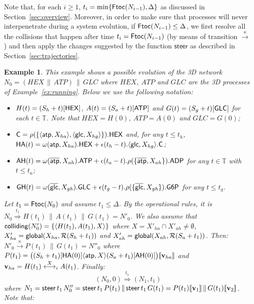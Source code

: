 \documentclass[11pt]{article}
\newtheorem{example}{Example}
\newcommand{\lsbrace}{\ensuremath{|\![}}
\newcommand{\rsbrace}{\ensuremath{]\!|}}
\newcommand{\reference}{{\sf global}}
\newcommand{\colliding}{{\sf colliding}}
\newcommand{\ftoc}{{\sf Ftoc}}
\newcommand{\mts}{\Delta}
\newcommand{\move}{\ensuremath{\mathsf{steer}}}
\newcommand{\nar}[1]{\xrightarrow{#1}}
\newcommand{\dnar}[1]{\stackrel{#1}{\Rightarrow}}
\newcommand{\collision}[2]{\stackrel{{#1}}{\longleftrightarrow}_{#2}}
\newcommand{\referencepoint}[1]{\ensuremath{{\cal R}(#1)}}
\newcommand{\timedomain}{{\mathbb T}}
\begin{document}
Note that, for each $i \geq 1$, $t_i = \min \{\ftoc(N_{i-1}), \mts\}$ as discussed in Section~\ref{sec:overview}. Moreover, in order to make sure that processes will never interpenetrate during a system evolution, if $\ftoc(N_{i-1}) \leq \mts$, we first resolve all the collisions that happen after time $t_i = \ftoc(N_{i-1})$ (by means of transition $\nar{\kappa}$) and then apply the changes suggested by the function $\move$ as described in Section~\ref{sec:trajectories}.

\begin{example}\label{ex:evolution}
This example shows a possible evolution of the 3D network $ N_0 = (HEX \,\|\, ATP) \,\|\, GLC$ where $HEX$, $ATP$ and $GLC$ are the 3D processes of Example~\ref{ex:running}. Below we use the following notation:

\begin{itemize}
\item [ - ]  $H(t)= (S_h + t) [{\sf HEX}]$, $A(t) = (S_a + t) [{\sf ATP}]$ and $G(t) = (S_g + t)
[{\sf GLC}]$ for each $t \in \timedomain$. Note that $HEX=H(0)$, $ATP=A(0)$ and $GLC=G(0)$;

\item [ - ]  ${\sf C}=  \rho(\{\langle {\sf atp}, X_{ha} \rangle, \langle  {\sf glc}, X_{hg}
\rangle\}). {\sf HEX}$  and, for any $t \leq t_h$,  ${\sf HA}(t) = \omega({\sf atp}, X_{ha}). {\sf
HEX} + \epsilon(t_h -t). \langle  {\sf glc}, X_{hg}  \rangle.{\sf C}$;

\item [ - ] ${\sf AH}(t) = \omega(\overline{{\sf atp}}, X_{ah}). {\sf ATP} + \epsilon(t_a -t).
\rho(\{ \overline{{\sf atp}}, X_{ah} \}). {\sf ADP}$ for any $t \in \timedomain$ with $t \leq t_a$;

\item [ - ]  ${\sf GH}(t) = \omega(\overline{{\sf glc}}, X_{gh}). {\sf GLC} + \epsilon(t_g -t).
\rho(\{ \overline{{\sf glc}}, X_{gh} \}). {\sf G6P}$ for any $t \leq t_g$.
\end{itemize}


\noindent Let $t_1 = \ftoc(N_0)$ and assume $t_1 \leq \mts$. By the operational rules, it is $N_0
\dnar{t_1} H(t_1) \,\|\, A(t_1) \,\|\, G(t_1) = N'_0$. We also assume that $\colliding(N'_0) =
\{\langle H(t_1), A(t_1), X \rangle \}$ where $X = X'_{ha} \cap X'_{ah} \neq \emptyset$, $X'_{ha}
= \reference(X_{ha}, \referencepoint{S_h + t_1})$ and $X'_{ah} = \reference(X_{ah},
\referencepoint{S_a + t_1})$. Then: $N'_0 \nar{\kappa} P(t_1) \,\|\, G(t_1) = N''_0$ where $P(t_1)
= \big((S_h+t_1) [{\sf HA}(0)] \langle {\sf atp}, X \rangle (S_a+t_1)[{\sf AH}(0)] \big)\lsbrace
{\bf v}_{ha} \rsbrace$ and ${\bf v}_{ha}  =  H(t_1)  \collision{X}{i} A(t_1)$. Finally: $$(N_0, 0)
\dnar{t_1} (N_1, t_1)$$ where $N_1 = \move \, t_1 \, N''_0 =  \move \, t_1 \, P(t_1) \,\|\, \move
\, t_1 \, G(t_1) = \\ P(t_1) \lsbrace {\bf v}_{1} \rsbrace \,\|\, G(t_1) \lsbrace {\bf v}_{2}
\rsbrace$. Note that:


\end{example}
\end{document}

